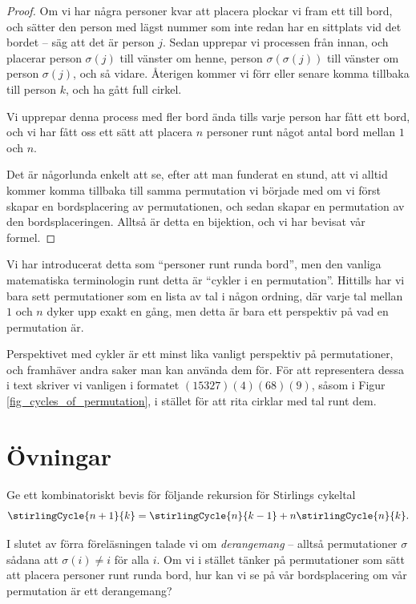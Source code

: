 \documentclass[nobib]{tufte-handout}
\begin{document}
\begin{theorem}
\begin{proof}
    Om vi har några personer kvar att placera plockar vi fram ett till bord, och sätter den person med lägst nummer som inte redan har en sittplats vid det bordet -- säg att det är person $j$. Sedan upprepar vi processen från innan, och placerar person $\sigma(j)$ till vänster om henne, person $\sigma(\sigma(j))$ till vänster om person $\sigma(j)$, och så vidare. Återigen kommer vi förr eller senare komma tillbaka till person $k$, och ha gått full cirkel.

    Vi upprepar denna process med fler bord ända tills varje person har fått ett bord, och vi har fått oss ett sätt att placera $n$ personer runt något antal bord mellan $1$ och $n$.

    Det är någorlunda enkelt att se, efter att man funderat en stund, att vi alltid kommer komma tillbaka till samma permutation vi började med om vi först skapar en bordsplacering av permutationen, och sedan skapar en permutation av den bordsplaceringen. Alltså är detta en bijektion, och vi har bevisat vår formel.
  \end{proof}
\end{theorem}

\begin{remark}
  Vi har introducerat detta som ``personer runt runda bord'', men den vanliga matematiska terminologin runt detta är ``cykler i en permutation''. Hittills har vi bara sett permutationer som en lista av tal i någon ordning, där varje tal mellan $1$ och $n$ dyker upp exakt en gång, men detta är bara ett perspektiv på vad en permutation är.

  Perspektivet med cykler är ett minst lika vanligt perspektiv på permutationer, och framhäver andra saker man kan använda dem för. För att representera dessa i text skriver vi vanligen i formatet $(15327)(4)(68)(9)$, såsom i Figur \ref{fig_cycles_of_permutation}, i stället för att rita cirklar med tal runt dem.
\end{remark}

\section{Övningar}

\begin{xca}
  Ge ett kombinatoriskt bevis för följande rekursion för Stirlings cykeltal
  $$\stirlingCycle{n+1}{k} = \stirlingCycle{n}{k-1} + n\stirlingCycle{n}{k}.$$
\end{xca}

\begin{xca}
  I slutet av förra föreläsningen talade vi om \emph{derangemang} -- alltså permutationer $\sigma$ sådana att $\sigma(i) \neq i$ för alla $i$. Om vi i stället tänker på permutationer som sätt att placera personer runt runda bord, hur kan vi se på vår bordsplacering om vår permutation är ett derangemang?
\end{xca}
\end{document}
